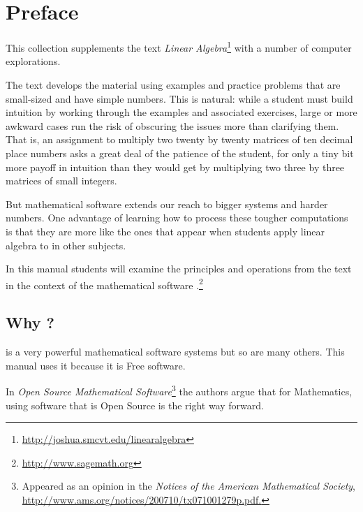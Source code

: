 \chapter*{Preface}\pagestyle{preface}\thispagestyle{preface}


This collection supplements the text
\textit{Linear Algebra}\footnote{\protect\url{http://joshua.smcvt.edu/linearalgebra}}
with a number of computer explorations.

The text develops the material using examples and practice problems
that are small-sized and have simple numbers.
This is natural: while a student must build intuition by
working through the examples and
associated exercises, large or more awkward
cases run the risk of obscuring the issues more than 
clarifying them.
That is, an assignment to multiply two twenty by twenty matrices
of ten decimal place numbers asks a great deal of the patience of the
student, for only a tiny bit more payoff in intuition than they would
get by 
multiplying two three by three matrices of small integers. 

But mathematical software extends our reach to bigger systems and
harder numbers.
One advantage of learning how to process these tougher computations is that 
they are more like the ones that appear when students apply linear 
algebra to in other subjects.

In this manual students will examine the principles and operations 
from the text in the context
of the mathematical software \sage{}.\footnote{\url{http://www.sagemath.org}}


\section{Why \sage?}
\sage{} is a very powerful mathematical software systems but so are
many others.
This manual uses it because it is Free software.

In 
\textit{Open Source Mathematical Software}\footnote{Appeared as an opinion in the \protect\textit{Notices of the American Mathematical Society}, \protect\url{http://www.ams.org/notices/200710/tx071001279p.pdf.}}
the authors argue that for Mathematics, using software that is Open Source
is the right way forward.

